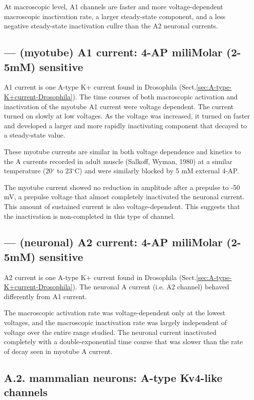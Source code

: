 At macroscopic level, A1 channels are faster and more voltage-dependent
macroscopic inactivation rate, a larger steady-state component, and a less
negative steady-state inactivation cullre than the A2 neuronal currents.

\subsection{--- (myotube) A1 current: 4-AP miliMolar (2-5mM) sensitive}
\label{sec:A1-K+-current}

A1 current is one A-type K+ current found in Drosophila
(Sect.\ref{sec:A-type-K+current-Drosophila}). The time courses of both
macroscopic activation and inactivation of the myotube A1 current were voltage
dependent. The current turned on slowly at low voltages.
As the voltage was increased, it turned on faster and developed a larger and
more rapidly inactivating component that decayed to a steady-state value.

These myotube currents are similar in both voltage dependence and kinetics to
the A currents recorded in adult muscle (Salkoff, Wyman, 1980) at a similar
temperature (20$^\circ$ to 23$^\circ$C) and were similarly blocked by 5 mM
external 4-AP.

The myotube current showed no reduction in amplitude after a prepulse to -50 mV,
a prepulse voltage that almost completely inactivated the neuronal current. This
amount of sustained current is also voltage-dependent. This suggests that the
inactivation is non-completed in this type of channel.

\subsection{--- (neuronal) A2 current: 4-AP miliMolar (2-5mM) sensitive}
\label{sec:A2-K+-current}

A2 current is one A-type K+ current found in Drosophila
(Sect.\ref{sec:A-type-K+current-Drosophila}). The neuronal A current (i.e. A2
channel) behaved differently from A1 current.

The macroscopic activation rate was voltage-dependent only at the lowest
voltages, and the macroscopic inactivation rate was largely independent of
voltage over the entire range studied. The neuronal current inactivated
completely with a double-exponential time course that was slower than the rate
of decay seen in myotube A current.


\subsection{A.2. mammalian neurons: A-type Kv4-like channels}
\label{sec:A-type-K+current-neuron}
\label{sec:K+current_4-AP-sensitive}

